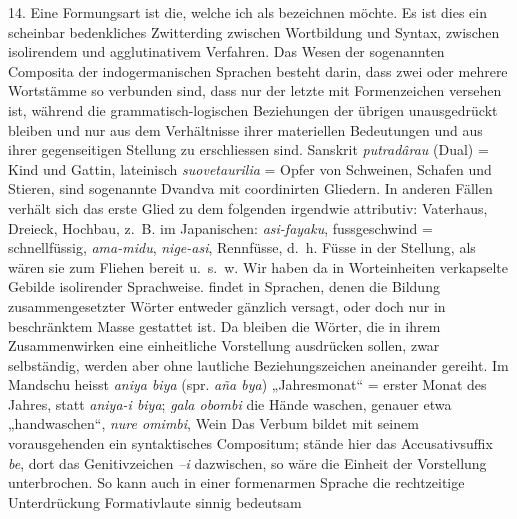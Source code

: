 \label{IV.III.II.4.14}14. Eine  Formungsart ist die, welche ich als  bezeichnen möchte. Es ist dies ein scheinbar bedenkliches Zwitterding zwischen Wortbildung und Syntax, zwischen isolirendem und agglutinativem Verfahren. Das Wesen der sogenannten  Composita der indogermanischen Sprachen besteht darin, dass zwei oder mehrere Wortstämme so  verbunden sind, dass nur der letzte mit Formenzeichen versehen ist, während die grammatisch-logischen Beziehungen der übrigen unausgedrückt bleiben und nur aus dem Verhältnisse ihrer materiellen Bedeutungen und aus ihrer gegenseitigen Stellung zu erschliessen \label{fp.210} sind. Sanskrit \textit{putradârau} (Dual) = Kind und Gattin, lateinisch \textit{suovetaurilia} = Opfer von Schweinen, Schafen und Stieren, sind sogenannte Dvandva mit coordinirten Gliedern. In anderen Fällen verhält sich das erste Glied zu dem folgenden irgendwie attributiv: Vaterhaus, Dreieck, Hochbau,  z.~B. im Japanischen: \textit{asi-fayaku}, fussgeschwind = schnellfüssig, \textit{ama-midu},  \textit{nige-asi}, Rennfüsse, d.~h. Füsse in der Stellung, als wären sie zum Fliehen bereit u.~s.~w. Wir haben da in Worteinheiten verkapselte Gebilde isolirender Sprachweise.  findet  in Sprachen, denen die Bildung zusammengesetzter Wörter entweder gänzlich versagt, oder doch nur in beschränktem Masse gestattet ist. Da bleiben die Wörter, die in ihrem Zusammenwirken eine einheitliche Vorstellung ausdrücken sollen, zwar selbständig, werden aber ohne lautliche Beziehungszeichen aneinander gereiht. Im Mandschu heisst \textit{aniya biya} (spr. \textit{aña bya}) „Jahresmonat“ = erster Monat des Jahres, statt \textit{aniya-i biya}; \textit{gala obombi} die Hände waschen, genauer etwa „handwaschen“, \textit{nure omimbi}, Wein  Das Verbum bildet mit seinem vorausgehenden  ein syntaktisches Compositum; stände hier das Accusativsuffix \textit{be}, dort das Genitivzeichen \textit{–i} dazwischen, so wäre die Einheit der Vorstellung unterbrochen.  So kann auch in einer formenarmen Sprache die rechtzeitige Unterdrückung  Formativlaute sinnig bedeutsam 

